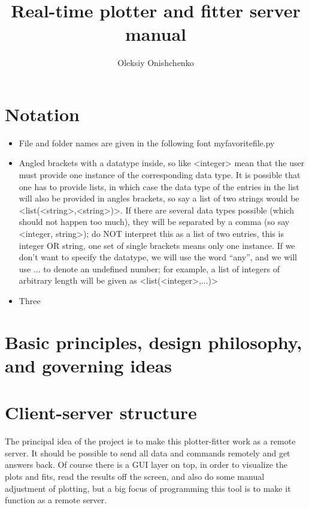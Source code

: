 \documentclass[11pt]{article} %
\title{Real-time plotter and fitter server manual}
\author{Oleksiy Onishchenko}
\begin{document}
\maketitle

\section{Notation}

\begin{itemize}
	\item File and folder names are given in the following font { myfavoritefile.py} 
	\item Angled brackets with a datatype inside, so like <integer> mean that the user must provide one instance of the corresponding data type. It is possible that one has to provide lists, in which case the data type of the entries in the list will also be provided in angles brackets, so say a list of two strings would be <list(<string>,<string>)>. If there are several data types possible (which should not happen too much), they will be separated by a comma (so say <integer, string>); do NOT interpret this as a list of two entries, this is integer OR string, one set of single brackets means only one instance. If we don't want to specify the datatype, we will use the word ``any'', and we will use ... to denote an undefined number; for example, a list of integers of arbitrary length will be given as <list(<integer>,...)>
	\item Three
\end{itemize}

\section{Basic principles, design philosophy, and governing ideas} \label{basicprinciples}

\section{Client-server structure}

The principal idea of the project is to make this plotter-fitter work as a remote server. It should be possible to send all data and commands remotely and get answers back. Of course there is a GUI layer on top, in order to visualize the plots and fits, read the results off the screen, and also do some manual adjustment of plotting, but a big focus of programming this tool is to make it function as a remote server.
\end{document}
